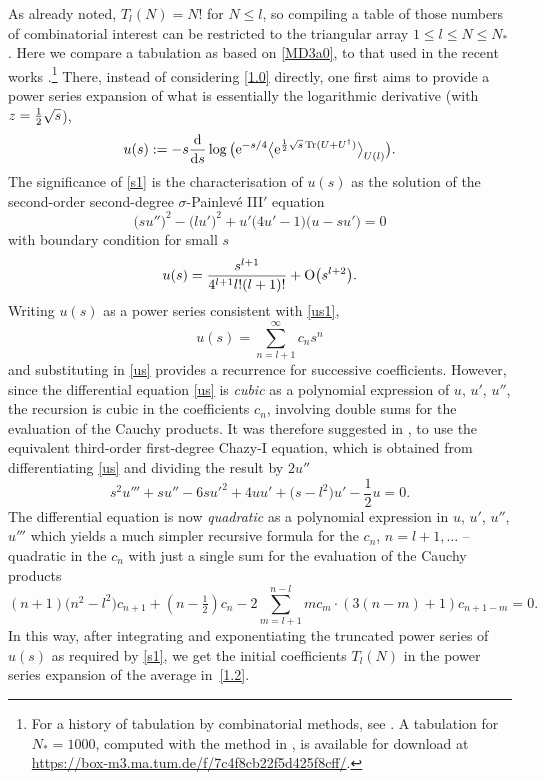 \documentclass[pdftex]{sigma}
\numberwithin{equation}{section}
\theoremstyle{definition}
\begin{document}
As already noted, $T_l(N)=N!$ for $N\leq l$, so compiling a table of those numbers of combinatorial interest can be restricted to the triangular array $1\leq l\leq N\leq N_*$. Here we compare a tabulation as based on \eqref{MD3a0}, to that used in the recent works \cite{Bo24,FM23}.\footnote{{For a history of tabulation by combinatorial methods, see \cite[p.\ 916]{Bo24}. A tabulation for $N_*=1000$, computed with the method in \cite[Section~3.2]{Bo24}, is available for download at \url{https://box-m3.ma.tum.de/f/7c4f8cb22f5d425f8cff/}.}}
There, instead of considering \eqref{1.0} directly, one first aims to provide a power series expansion of what is essentially the logarithmic derivative
 \big(with $z = {1 \over 2} \sqrt{s}$\big),
 \begin{equation}\label{s1}
 u(s) := - s {{\rm d} \over {\rm d}s} \log \big (
 {\rm e}^{-s/4} \big \langle {\rm e}^{{1 \over 2} \sqrt{s} \operatorname{Tr}(U + U^\dagger)} \big \rangle_{U(l)} \big ).
 \end{equation}
 The significance of \eqref{s1} is the characterisation of $u(s)$ as the solution of the second-order second-degree $\sigma$-Painlev\'e III$'$ equation \cite{FW02,TW94b}
\begin{equation}\label{us}
\bigl(su''\bigr)^2 -\bigl(l u'\bigr)^2 +u' \bigl(4 u' - 1\bigr)\bigl(u - su'\bigr) = 0
\end{equation}
with boundary condition for small $s$
\begin{equation}\label{us1}
u(s) = {s^{l+1} \over 4^{l+1} l!(l+1)!} + {\rm O}\bigl(s^{l+2}\bigr).
\end{equation}
Writing $u(s)$ as a power series consistent with \eqref{us1},
\[
u(s) = \sum_{n=l+1}^\infty c_n s^n
\]
 and substituting in \eqref{us} provides a recurrence for successive coefficients. However, since the differential equation
 \eqref{us} is {\em cubic} as a polynomial expression of $u$, $u'$, $u''$, the recursion is cubic in the coefficients $c_n$, involving double sums for the evaluation of the Cauchy products. It was therefore suggested in \cite[Section~3.2]{Bo24}, to use the equivalent third-order first-degree Chazy-I equation, which is obtained from differentiating \eqref{us} and dividing the result by $2u''$
\begin{equation}\label{us-ChazyI}
s^2u''' + s u'' -6s u'^2 +4 u u' +\bigl(s-l^2\bigr)u' -\frac{1}{2}u = 0.
\end{equation}
The differential equation is now {\em quadratic} as a polynomial expression in $u$, $u'$, $u''$, $u'''$ which yields a much simpler recursive formula for the $c_n$, $n=l+1,\ldots$ -- quadratic in the $c_n$ with just a single sum for the evaluation of the Cauchy products
\[%
(n+1)\bigl(n^2-l^2\bigr)c_{n+1} + (n-\tfrac12)c_n - 2\sum_{m=l+1}^{n-l} m c_m \cdot (3(n-m)+1) c_{n+1-m} = 0.
\]
In this way, after integrating and exponentiating the truncated power series of $u(s)$ as required by \eqref{s1}, we get the initial coefficients $T_l(N)$ in the power series expansion of the average in~\eqref{1.2}.
\end{document}
